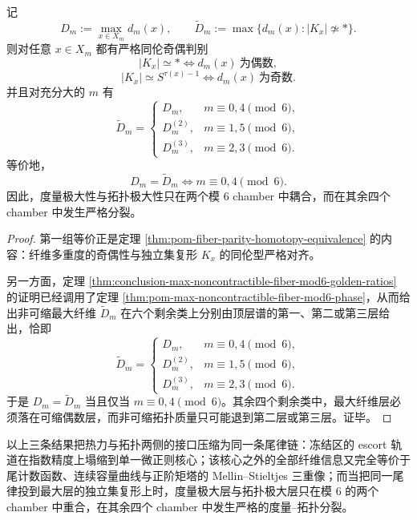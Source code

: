 \begin{theorem}\label{thm:conclusion-maxfiber-vs-noncontractible-mod6-splitting}
记
\[
D_m:=\max_{x\in X_m}d_m(x),
\qquad
\widetilde D_m:=\max\{d_m(x): |K_x|\not\simeq *\}.
\]
则对任意 \(x\in X_m\) 都有严格同伦奇偶判别
\[
|K_x|\simeq *
\iff
d_m(x)\ \text{为偶数},
\]
\[
|K_x|\simeq S^{\tau(x)-1}
\iff
d_m(x)\ \text{为奇数}.
\]
并且对充分大的 \(m\) 有
\[
\widetilde D_m=
\begin{cases}
D_m, & m\equiv 0,4\pmod 6,\\[4pt]
D_m^{(2)}, & m\equiv 1,5\pmod 6,\\[4pt]
D_m^{(3)}, & m\equiv 2,3\pmod 6.
\end{cases}
\]
等价地，
\[
D_m=\widetilde D_m
\iff
m\equiv 0,4\pmod 6.
\]
因此，度量极大性与拓扑极大性只在两个模 \(6\) chamber 中耦合，而在其余四个 chamber 中发生严格分裂。
\end{theorem}
\begin{proof}
第一组等价正是定理 \ref{thm:pom-fiber-parity-homotopy-equivalence} 的内容：纤维多重度的奇偶性与独立集复形 \(K_x\) 的同伦型严格对齐。

另一方面，定理 \ref{thm:conclusion-max-noncontractible-fiber-mod6-golden-ratios} 的证明已经调用了定理 \ref{thm:pom-max-noncontractible-fiber-mod6-phase}，从而给出非可缩最大纤维 \(\widetilde D_m\) 在六个剩余类上分别由顶层谱的第一、第二或第三层给出，恰即
\[
\widetilde D_m=
\begin{cases}
D_m, & m\equiv 0,4\pmod 6,\\
D_m^{(2)}, & m\equiv 1,5\pmod 6,\\
D_m^{(3)}, & m\equiv 2,3\pmod 6.
\end{cases}
\]
于是
\(
D_m=\widetilde D_m
\)
当且仅当 \(m\equiv 0,4\pmod 6\)。其余四个剩余类中，最大纤维层必须落在可缩偶数层，而非可缩拓扑质量只可能退到第二层或第三层。证毕。
\end{proof}

以上三条结果把热力与拓扑两侧的接口压缩为同一条尾律链：冻结区的 escort 轨道在指数精度上塌缩到单一微正则核心；该核心之外的全部纤维信息又完全等价于尾计数函数、连续容量曲线与正阶矩塔的 Mellin--Stieltjes 三重像；而当把同一尾律投到最大层的独立集复形上时，度量极大层与拓扑极大层只在模 \(6\) 的两个 chamber 中重合，在其余四个 chamber 中发生严格的度量--拓扑分裂。
